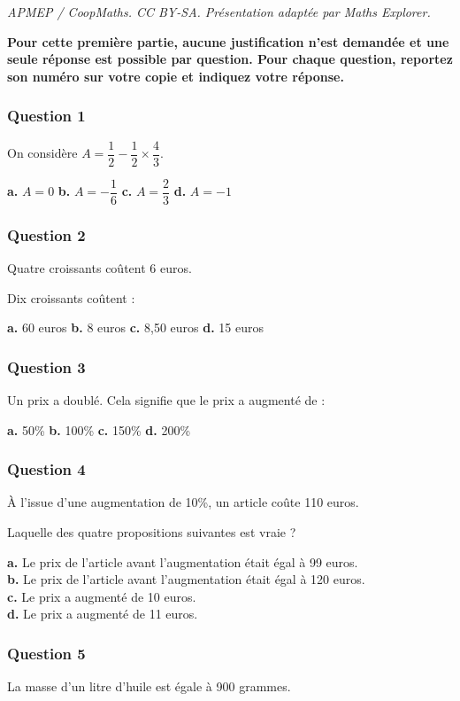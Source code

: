 \documentclass[10pt]{article}
\begin{document}
\noindent\textit{APMEP / CoopMaths. CC BY-SA. Présentation adaptée par Maths Explorer.}\par\medskip
\textbf{Pour cette première partie, aucune justification n'est demandée et une seule réponse est possible par question. Pour chaque question, reportez son numéro sur votre copie et indiquez votre réponse.}

\subsubsection*{Question 1}
On considère $A = \dfrac{1}{2} - \dfrac{1}{2} \times \dfrac{4}{3}$.

\textbf{a.} $A = 0$ \hfill \textbf{b.} $A = -\dfrac{1}{6}$ \hfill \textbf{c.} $A = \dfrac{2}{3}$ \hfill \textbf{d.} $A = -1$

\subsubsection*{Question 2}
Quatre croissants coûtent 6 euros.

Dix croissants coûtent :

\textbf{a.} 60 euros \hfill \textbf{b.} 8 euros \hfill \textbf{c.} 8,50 euros \hfill \textbf{d.} 15 euros

\subsubsection*{Question 3}
Un prix a doublé. Cela signifie que le prix a augmenté de :

\textbf{a.} 50\% \hfill \textbf{b.} 100\% \hfill \textbf{c.} 150\% \hfill \textbf{d.} 200\%

\subsubsection*{Question 4}
À l'issue d'une augmentation de 10\%, un article coûte 110 euros.

Laquelle des quatre propositions suivantes est vraie ?

\textbf{a.} Le prix de l'article avant l'augmentation était égal à 99 euros. \\
\textbf{b.} Le prix de l'article avant l'augmentation était égal à 120 euros. \\
\textbf{c.} Le prix a augmenté de 10 euros. \\
\textbf{d.} Le prix a augmenté de 11 euros.

\subsubsection*{Question 5}
La masse d'un litre d'huile est égale à 900 grammes.
\end{document}

